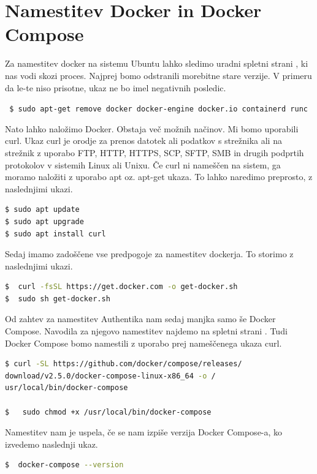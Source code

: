 \documentclass[a4paper,12pt,openright]{book}
\begin{document}
\section{Namestitev Docker in Docker Compose}
Za namestitev docker na sistemu Ubuntu lahko sledimo uradni spletni strani \cite{DockerLink}, ki nas vodi skozi proces. Najprej bomo odstranili morebitne stare verzije. V primeru da le-te niso prisotne, ukaz ne bo imel negativnih posledic.

 \texttt{ \$ sudo apt-get remove docker docker-engine docker.io containerd runc}

 Nato lahko naložimo Docker. Obstaja več možnih načinov. Mi bomo uporabili curl.
 Ukaz curl je orodje za prenos datotek ali podatkov s strežnika ali na strežnik z uporabo FTP, HTTP, HTTPS, SCP, SFTP, SMB in drugih podprtih protokolov v sistemih Linux ali Unixu. Če curl ni nameščen na sistem, ga moramo naložiti z uporabo apt oz. apt-get ukaza. To lahko naredimo preprosto, z naslednjimi ukazi.
 
\begin{lstlisting}[language=bash]
$ sudo apt update
$ sudo apt upgrade
$ sudo apt install curl
\end{lstlisting}

Sedaj imamo zadoščene vse predpogoje za namestitev dockerja. To storimo z naslednjimi ukazi.

\begin{lstlisting}[language=bash]
$  curl -fsSL https://get.docker.com -o get-docker.sh
$  sudo sh get-docker.sh
\end{lstlisting}

Od zahtev za namestitev Authentika nam sedaj manjka samo še Docker Compose. Navodila za njegovo namestitev najdemo na spletni strani \cite{DockerCompose}. 
Tudi Docker Compose bomo namestili z uporabo prej nameščenega ukaza curl.


\begin{lstlisting}[language=bash]
$ curl -SL https://github.com/docker/compose/releases/
download/v2.5.0/docker-compose-linux-x86_64 -o /
usr/local/bin/docker-compose

$   sudo chmod +x /usr/local/bin/docker-compose
\end{lstlisting}

Namestitev nam je uspela, če se nam izpiše verzija Docker Compose-a, ko izvedemo naslednji ukaz.

\begin{lstlisting}[language=bash]
$  docker-compose --version
\end{lstlisting}
\end{document}
